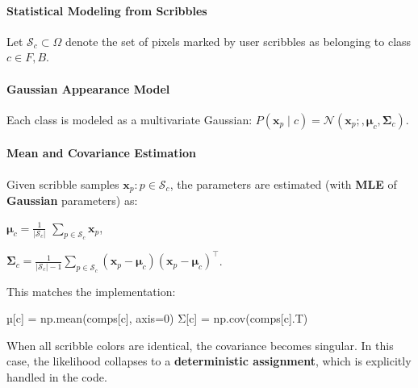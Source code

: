 \documentclass[11pt]{article}
\newenvironment{Shaded}{}{}
\newcommand{\DecValTok}[1]{\textcolor[rgb]{0.25,0.63,0.44}{{#1}}}
\newcommand{\NormalTok}[1]{{#1}}
\newcommand{\OperatorTok}[1]{\textcolor[rgb]{0.40,0.40,0.40}{{#1}}}
\begin{document}
\hypertarget{statistical-modeling-from-scribbles}{%
\paragraph{\texorpdfstring{\textbf{Statistical Modeling from
Scribbles}}{Statistical Modeling from Scribbles}}\label{statistical-modeling-from-scribbles}}

Let \(\mathcal{S}_c \subset \Omega\) denote the set of pixels marked by
user scribbles as belonging to class \(c \in {F,B}\).

\hypertarget{gaussian-appearance-model}{%
\paragraph{\texorpdfstring{\textbf{Gaussian Appearance
Model}}{Gaussian Appearance Model}}\label{gaussian-appearance-model}}

Each class is modeled as a multivariate Gaussian:
\(P(\mathbf{x}_p \mid c) = \mathcal{N}(\mathbf{x}_p;,\boldsymbol{\mu}_c,\boldsymbol{\Sigma}_c)\).

\hypertarget{mean-and-covariance-estimation}{%
\paragraph{\texorpdfstring{\textbf{Mean and Covariance
Estimation}}{Mean and Covariance Estimation}}\label{mean-and-covariance-estimation}}

Given scribble samples \({\mathbf{x}_p : p \in \mathcal{S}_c}\), the
parameters are estimated (with \textbf{MLE} of \textbf{Gaussian}
parameters) as:

\(\boldsymbol{\mu}_c = \frac{1}{|\mathcal{S}_c|}\)
\(\sum\limits_{p \in \mathcal{S}_c} \mathbf{x}_p\),

\(\boldsymbol{\Sigma}_c = \frac{1}{|\mathcal{S}_c|-1} \sum\limits_{p \in \mathcal{S}_c} (\mathbf{x}_p-\boldsymbol{\mu}_c)(\mathbf{x}_p-\boldsymbol{\mu}_c)^\top\).

This matches the implementation:

\begin{Shaded}
\begin{Highlighting}[]
\NormalTok{µ[c] }\OperatorTok{=}\NormalTok{ np.mean(comps[c], axis}\OperatorTok{=}\DecValTok{0}\NormalTok{)}
\NormalTok{Σ[c] }\OperatorTok{=}\NormalTok{ np.cov(comps[c].T)}
\end{Highlighting}
\end{Shaded}

When all scribble colors are identical, the covariance becomes singular.
In this case, the likelihood collapses to a \textbf{deterministic
assignment}, which is explicitly handled in the code.
\end{document}
